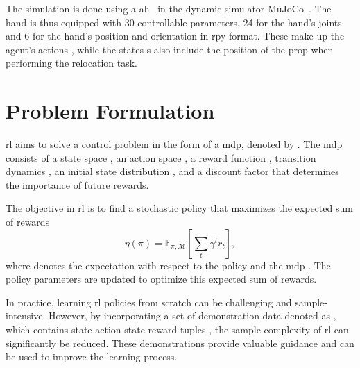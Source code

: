 The simulation is done using a \gls{ah}~\cite{learning-complex-dexterous-manipulation-with-deep-reinforcement-learning-and-demonstrations} in the dynamic simulator MuJoCo~\cite{todorov2012mujoco}. The hand is thus equipped with \num{30} controllable parameters, \num{24} for the hand's joints and \num{6} for the hand's position  and orientation  in \gls{rpy} format. These make up the agent's actions , while the states {s} also include the position of the prop when performing the relocation task.

\section{Problem Formulation}\label{sec:3-in-hand-manipulation-problem-formulation}

\gls{rl} aims to solve a control problem in the form of a \gls{mdp}, denoted by . The \gls{mdp} consists of a state space , an action space , a reward function , transition dynamics , an initial state distribution , and a discount factor \mvar{\gamma \in [0, 1]} that determines the importance of future rewards. \medskip

The objective in \gls{rl} is to find a stochastic policy  that maximizes the expected sum of rewards
%
\begin{equation}
	\eta(\pi) = \mathbb{E}_{\pi, \mathcal{M}} \left[\sum_t \gamma^t r_t\right],
\end{equation}
where  denotes the expectation with respect to the policy \mvar{\pi} and the \gls{mdp} . The policy parameters \mvar{\theta} are updated to optimize this expected sum of rewards.\medskip

In practice, learning \gls{rl} policies from scratch can be challenging and sample-intensive. However, by incorporating a set of demonstration data denoted as , which contains state-action-state-reward tuples , the sample complexity of \gls{rl} can significantly be reduced. These demonstrations provide valuable guidance and can be used to improve the learning process.

